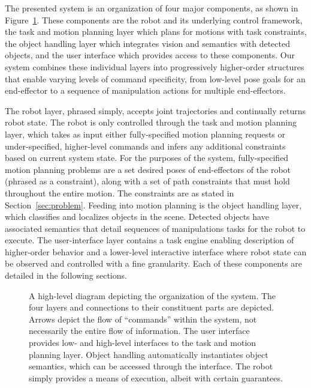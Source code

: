 The presented system is an organization of four major components, as shown in Figure~\ref{fig:system_diagram}.
These components are
  the robot and its underlying control framework,
  the task and motion planning layer which plans for motions with task constraints,
  the object handling layer which integrates vision and semantics with detected objects,
  and the user interface which provides access to these components.
Our system combines these individual layers into progressively higher-order structures that enable varying levels of command specificity, from low-level pose goals for an end-effector to a sequence of manipulation actions for multiple end-effectors.

The robot layer, phrased simply, accepts joint trajectories and continually returns robot state.
The robot is only controlled through the task and motion planning layer, which takes as input either fully-specified motion planning requests or under-specified, higher-level commands and infers any additional constraints based on current system state.
For the purposes of the system, fully-specified motion planning problems are a set desired poses of end-effectors of the robot (phrased as a constraint), along with a set of path constraints that must hold throughout the entire motion.
The constraints are as stated in Section~\ref{sec:problem}.
Feeding into motion planning is the object handling layer, which classifies and localizes objects in the scene.
Detected objects have associated semantics that detail sequences of manipulations tasks for the robot to execute.
The user-interface layer contains a task engine enabling description of higher-order behavior and a lower-level interactive interface where robot state can be observed and controlled with a fine granularity.
Each of these components are detailed in the following sections.

\begin{figure}
  \centering
  \resizebox{0.49\textwidth}{!} {
    
  }
  \caption[High-level System Diagram] {
    \label{fig:system_diagram}
    A high-level diagram depicting the organization of the system.
    The four layers and connections to their constituent parts are depicted.
    Arrows depict the flow of ``commands'' within the system, not necessarily the entire flow of information.
    The user interface provides low- and high-level interfaces to the task and motion planning layer.
    Object handling automatically instantiates object semantics, which can be accessed through the interface.
    The robot simply provides a means of execution, albeit with certain guarantees.
  }
\end{figure}

